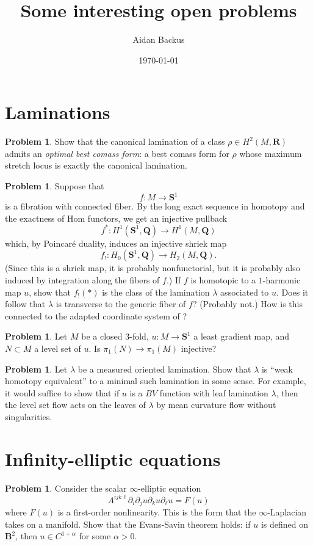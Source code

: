 \documentclass[reqno,11pt]{amsart}
\title{Some interesting open problems}
\author{Aidan Backus}
\date{\today}
\newcommand{\QQ}{\mathbf{Q}}
\newcommand{\RR}{\mathbf{R}}
\newcommand{\Sph}{\mathbf S}
\newcommand{\Ball}{\mathbf{B}}
\newcommand{\dfn}[1]{\emph{#1}\index{#1}}
\theoremstyle{definition}
\newtheorem{problem}[theorem]{Problem}
\numberwithin{equation}{section}
\begin{document}
\maketitle

\section{Laminations}

\begin{problem}
Show that the canonical lamination of a class $\rho \in H^2(M, \RR)$ admits an \dfn{optimal best comass form}: a best comass form for $\rho$ whose maximum stretch locus is exactly the canonical lamination.
\end{problem}

\begin{problem}
Suppose that 
$$f: M \to \Sph^1$$
is a fibration with connected fiber.
By the long exact sequence in homotopy and the exactness of Hom functors, we get an injective pullback 
$$f^*: H^1(\Sph^1, \QQ) \to H^1(M, \QQ)$$
which, by Poincar\'e duality, induces an injective shriek map 
$$f_!: H_0(\Sph^1, \QQ) \to H_2(M, \QQ).$$
(Since this is a shriek map, it is probably nonfunctorial, but it is probably also induced by integration along the fibers of $f$.)
If $f$ is homotopic to a $1$-harmonic map $u$, show that $f_!(*)$ is the class of the lamination $\lambda$ associated to $u$.
Does it follow that $\lambda$ is transverse to the generic fiber of $f$? (Probably not.)
How is this connected to the adapted coordinate system of \cite[\S3.3]{daskalopoulos2022transverse}?
\end{problem}

\begin{problem}
Let $M$ be a closed $3$-fold, $u: M \to \Sph^1$ a least gradient map, and $N \subset M$ a level set of $u$. Is $\pi_1(N) \to \pi_1(M)$ injective?
\end{problem}

\begin{problem}
Let $\lambda$ be a measured oriented lamination.
Show that $\lambda$ is ``weak homotopy equivalent'' to a minimal such lamination in some sense.
For example, it would suffice to show that if $u$ is a $BV$ function with leaf lamination $\lambda$, then the level set flow acts on the leaves of $\lambda$ by mean curvature flow without singularities.
\end{problem}

\section{Infinity-elliptic equations}
\begin{problem}
Consider the scalar $\infty$-elliptic equation 
$$A^{ijk\ell} \partial_i \partial_j u \partial_k u \partial_\ell u = F(u)$$
where $F(u)$ is a first-order nonlinearity.
This is the form that the $\infty$-Laplacian takes on a manifold.
Show that the Evans-Savin theorem \cite{Evans08} holds: if $u$ is defined on $\Ball^2$, then $u \in C^{1 + \alpha}$ for some $\alpha > 0$.
\end{problem}
\end{document}
